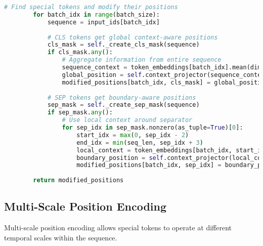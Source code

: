 \begin{lstlisting}[language=Python, caption=Learned position embeddings with special token support]
        # Find special tokens and modify their positions
        for batch_idx in range(batch_size):
            sequence = input_ids[batch_idx]
            
            # CLS tokens get global context-aware positions
            cls_mask = self._create_cls_mask(sequence)
            if cls_mask.any():
                # Aggregate information from entire sequence
                sequence_context = token_embeddings[batch_idx].mean(dim=0, keepdim=True)
                global_position = self.context_projector(sequence_context)
                modified_positions[batch_idx, cls_mask] = global_position
                
            # SEP tokens get boundary-aware positions
            sep_mask = self._create_sep_mask(sequence)
            if sep_mask.any():
                # Use local context around separator
                for sep_idx in sep_mask.nonzero(as_tuple=True)[0]:
                    start_idx = max(0, sep_idx - 2)
                    end_idx = min(seq_len, sep_idx + 3)
                    local_context = token_embeddings[batch_idx, start_idx:end_idx].mean(dim=0)
                    boundary_position = self.context_projector(local_context)
                    modified_positions[batch_idx, sep_idx] = boundary_position
                    
        return modified_positions
\end{lstlisting}

\subsection{Multi-Scale Position Encoding}

Multi-scale position encoding allows special tokens to operate at different temporal scales within the sequence.

